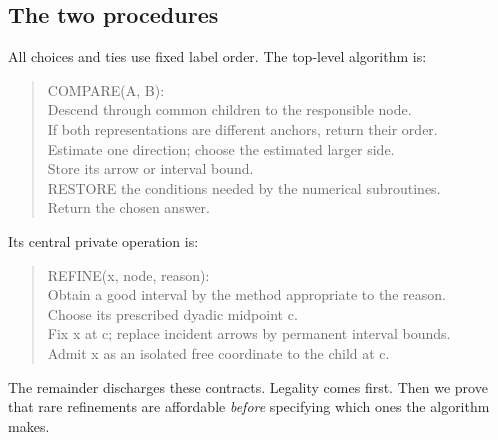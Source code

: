 \subsection{The two procedures}

All choices and ties use fixed label order. The top-level algorithm is:

\begin{quote}\ttfamily\small
COMPARE(A, B):\\
\hspace*{1em}Descend through common children to the responsible node.\\
\hspace*{1em}If both representations are different anchors, return their order.\\
\hspace*{1em}Estimate one direction; choose the estimated larger side.\\
\hspace*{1em}Store its arrow or interval bound.\\
\hspace*{1em}RESTORE the conditions needed by the numerical subroutines.\\
\hspace*{1em}Return the chosen answer.
\end{quote}

Its central private operation is:

\begin{quote}\ttfamily\small
REFINE(x, node, reason):\\
\hspace*{1em}Obtain a good interval by the method appropriate to the reason.\\
\hspace*{1em}Choose its prescribed dyadic midpoint c.\\
\hspace*{1em}Fix x at c; replace incident arrows by permanent interval bounds.\\
\hspace*{1em}Admit x as an isolated free coordinate to the child at c.
\end{quote}


The remainder discharges these contracts. Legality comes first. Then we prove that rare refinements are affordable \emph{before} specifying which ones the algorithm makes.

